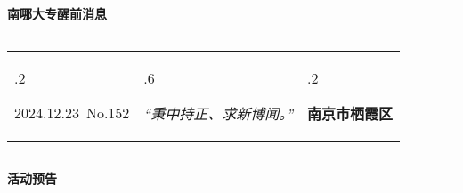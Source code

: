 \documentclass[letterpaper, 12pt]{article}
\begin{document}
\begin{center}
    \Huge\textbf{南哪大专醒前消息}
\end{center}
\vspace{4mm}
\hrule
\renewcommand\tabularxcolumn[1]{m{#1}}
\begin{tabularx}{\textwidth}{>{\hsize.2\hsize}X>{\hsize.6\hsize}X>{\hsize.2\hsize}X}
    \begin{flushleft}
        2024.12.23\, No.152
    \end{flushleft}
    &
    \begin{center}
        \textit{“秉中持正、求新博闻。”}
    \end{center}
    &
    \begin{flushright}
        \textbf{南京市栖霞区}
    \end{flushright}
\end{tabularx}
\vspace{-3.5mm}
\hrule
\vspace{4mm}
\centerline{\huge\textbf{活动预告}}
\end{document}
